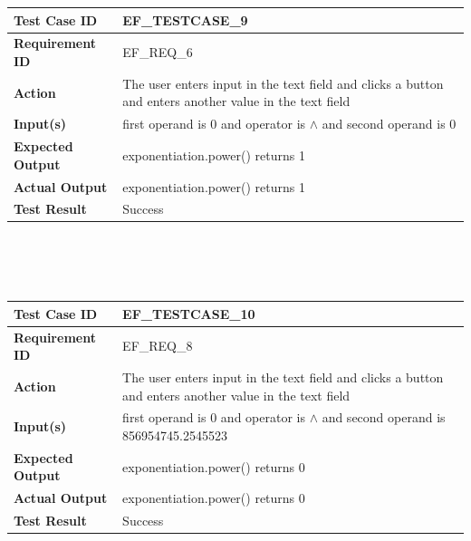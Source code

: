 \documentclass[11pt, english]{report}
\begin{document}
\setlength{\tabcolsep}{18pt}
\renewcommand{\arraystretch}{1.5}
\begin{tabular}{ |p{4cm}|p{8cm}| }
\hline
\textbf{Test Case ID} &  EF\_TESTCASE\_9 \\ \hline 
\textbf{Requirement ID} & EF\_REQ\_6\\ \hline
\textbf{Action} & The user enters input in the text field and clicks a button and enters another value in the text field\\ \hline
\textbf{Input(s)} & first operand is 0 and operator is $\wedge$ and second operand is 0 \\ \hline
\textbf{Expected Output} & exponentiation.power() returns 1 \\ \hline
\textbf{Actual Output} & exponentiation.power() returns 1 \\ \hline
\textbf{Test Result} & Success \\ 
\hline
\end{tabular} \\ \\ \\

\setlength{\tabcolsep}{18pt}
\renewcommand{\arraystretch}{1.5}
\begin{tabular}{ |p{4cm}|p{8cm}| }
\hline
\textbf{Test Case ID} &  EF\_TESTCASE\_10 \\ \hline 
\textbf{Requirement ID} & EF\_REQ\_8\\ \hline
\textbf{Action} & The user enters input in the text field and clicks a button and enters another value in the text field\\ \hline
\textbf{Input(s)} & first operand is 0 and operator is $\wedge$ and second operand is 856954745.2545523 \\ \hline
\textbf{Expected Output} & exponentiation.power() returns 0 \\ \hline
\textbf{Actual Output} & exponentiation.power() returns 0 \\ \hline
\textbf{Test Result} & Success \\ 
\hline
\end{tabular} \\ \\ \\
\end{document}
